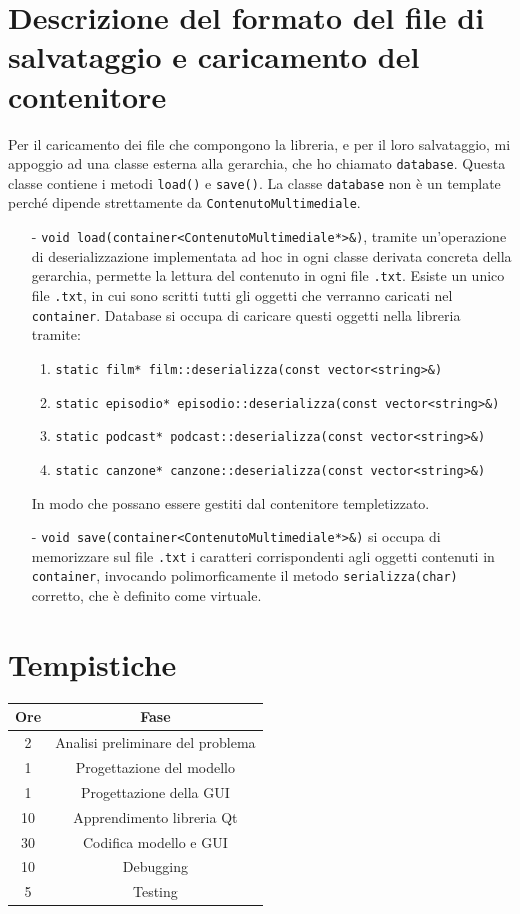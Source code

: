 \documentclass[a4paper,10pt]{article}
\begin{document}
\section{Descrizione del formato del file di salvataggio e caricamento del contenitore}
Per il caricamento dei file che compongono la libreria, e per il loro salvataggio, mi appoggio ad una classe esterna alla gerarchia, che ho chiamato \texttt{database}. Questa classe contiene i metodi \texttt{load()} e \texttt{save()}. La classe \texttt{database} non è un template perché dipende strettamente da \texttt{ContenutoMultimediale}. 
\begin{enumerate}
\item[-] \texttt{void load(container<ContenutoMultimediale*>\&)}, tramite un'operazione di deserializzazione implementata ad hoc in ogni classe derivata concreta della gerarchia, permette la lettura del contenuto in ogni file \texttt{.txt}. Esiste un unico file \texttt{.txt}, in cui sono scritti tutti gli oggetti che verranno caricati nel \texttt{container}.  Database si occupa di caricare questi oggetti nella libreria tramite:
\begin{enumerate}
	\item \texttt{static film* film::deserializza(const vector<string>\&)}
	\item \texttt{static episodio* episodio::deserializza(const vector<string>\&)}
	\item \texttt{static podcast* podcast::deserializza(const vector<string>\&)}
	\item \texttt{static canzone* canzone::deserializza(const vector<string>\&)}
\end{enumerate} 
In modo che possano essere gestiti dal contenitore templetizzato.
\item[-] \texttt{void save(container<ContenutoMultimediale*>\&)} si occupa di memorizzare sul file \texttt{.txt} i caratteri corrispondenti agli oggetti contenuti in \texttt{container}, invocando polimorficamente il metodo \texttt{serializza(char)} corretto, che è definito come virtuale.
\end{enumerate}

\section{Tempistiche}

\begin{center}
 \begin{tabular}{||c | c ||} 
 	\hline
 \hline
 \textbf{Ore} & \textbf{Fase}  \\ 
 \hline\hline
 2 & Analisi preliminare del problema \\ 
 \hline
 1 & Progettazione del modello \\
 \hline
 1 & Progettazione della GUI\\
 \hline
 10 & Apprendimento libreria Qt \\
 \hline
 30 & Codifica modello e GUI\\ 
 \hline
 10 & Debugging \\
 \hline
 5 & Testing\\
 \hline
 \hline
\end{tabular}
\end{center}
\end{document}
